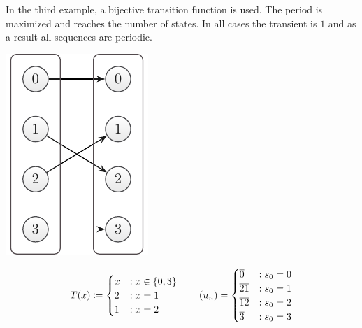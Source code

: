 \documentclass{stdlocal}
\begin{document}
    \noindent
    In the third example, a bijective transition function is used.
    The period is maximized and reaches the number of states.
    In all cases the transient is $1$ and as a result all sequences are periodic.

    \medskip
    \begin{minipage}{0.2\textwidth}
      \includegraphics[width=\textwidth]{figures/periodicity_example_d.pdf}
    \end{minipage}
    \hfill
    \begin{minipage}{0.73\textwidth}
      \[
        T(x) \define
        \begin{cases}
          x &: x \in \set{0,3}{} \\
          2 &: x = 1 \\
          1 &: x = 2
        \end{cases}
      \separate
        (u_n) =
        \begin{cases}
          \overline{0} &: s_0 = 0 \\
          \overline{21} &: s_0 = 1 \\
          \overline{12} &: s_0 = 2 \\
          \overline{3} &: s_0 = 3
        \end{cases}
      \]
    \end{minipage}
    \medskip
\end{document}
